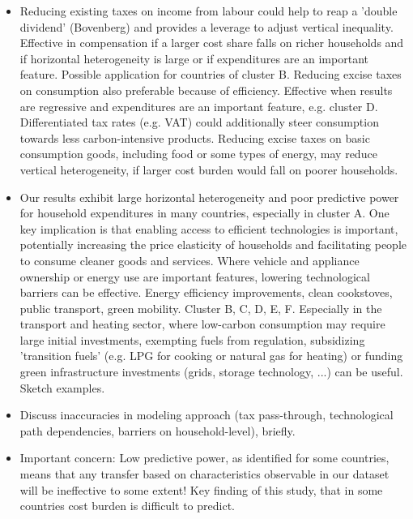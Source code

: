\documentclass[12pt, a4paper]{article}
\begin{document}
\begin{itemize}
\item Reducing existing taxes on income from labour could help to reap a 'double dividend' (Bovenberg) and provides a leverage to adjust vertical inequality. Effective in compensation if a larger cost share falls on richer households and if horizontal heterogeneity is large or if expenditures are an important feature. Possible application for countries of cluster B. Reducing excise taxes on consumption also preferable because of efficiency. Effective when results are regressive and expenditures are an important feature, e.g. cluster D. Differentiated tax rates (e.g. VAT) could additionally steer consumption towards less carbon-intensive products. Reducing excise taxes on basic consumption goods, including food or some types of energy, may reduce vertical heterogeneity, if larger cost burden would fall on poorer households. 
\item Our results exhibit large horizontal heterogeneity and poor predictive power for household expenditures in many countries, especially in cluster A. One key implication is that enabling access to efficient technologies is important, potentially increasing the price elasticity of households and facilitating people to consume cleaner goods and services. Where vehicle and appliance ownership or energy use are important features, lowering technological barriers can be effective. Energy efficiency improvements, clean cookstoves, public transport, green mobility. Cluster B, C, D, E, F. Especially in the transport and heating sector, where low-carbon consumption may require large initial investments, exempting fuels from regulation, subsidizing 'transition fuels' (e.g. LPG for cooking or natural gas for heating) or funding green infrastructure investments (grids, storage technology, ...) can be useful. Sketch examples.
\item Discuss inaccuracies in modeling approach (tax pass-through, technological path dependencies, barriers on household-level), briefly.
\item Important concern: Low predictive power, as identified for some countries, means that any transfer based on characteristics observable in our dataset will be ineffective to some extent! Key finding of this study, that in some countries cost burden is difficult to predict.

\end{itemize}
\end{document}
